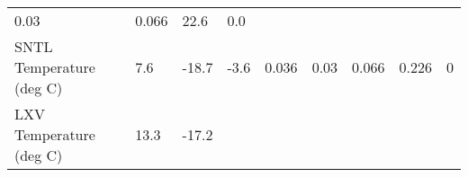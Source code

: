 \documentclass[11pt]{article}
\begin{document}
\begin{longtable}[]{@{}lllllllll@{}}
\begin{minipage}[t]{0.07\columnwidth}
0.03\strut
\end{minipage} & \begin{minipage}[t]{0.06\columnwidth}\raggedright\strut
0.066\strut
\end{minipage} & \begin{minipage}[t]{0.06\columnwidth}\raggedright\strut
22.6\strut
\end{minipage} & \begin{minipage}[t]{0.07\columnwidth}\raggedright\strut
0.0\strut
\end{minipage}\tabularnewline
\begin{minipage}[t]{0.25\columnwidth}\raggedright\strut
SNTL Temperature (deg C)\strut
\end{minipage} & \begin{minipage}[t]{0.06\columnwidth}\raggedright\strut
7.6\strut
\end{minipage} & \begin{minipage}[t]{0.06\columnwidth}\raggedright\strut
-18.7\strut
\end{minipage} & \begin{minipage}[t]{0.08\columnwidth}\raggedright\strut
-3.6\strut
\end{minipage} & \begin{minipage}[t]{0.05\columnwidth}\raggedright\strut
0.036\strut
\end{minipage} & \begin{minipage}[t]{0.07\columnwidth}\raggedright\strut
0.03\strut
\end{minipage} & \begin{minipage}[t]{0.06\columnwidth}\raggedright\strut
0.066\strut
\end{minipage} & \begin{minipage}[t]{0.06\columnwidth}\raggedright\strut
0.226\strut
\end{minipage} & \begin{minipage}[t]{0.07\columnwidth}\raggedright\strut
0\strut
\end{minipage}\tabularnewline
\begin{minipage}[t]{0.25\columnwidth}\raggedright\strut
LXV Temperature (deg C)\strut
\end{minipage} & \begin{minipage}[t]{0.06\columnwidth}\raggedright\strut
13.3\strut
\end{minipage} & \begin{minipage}[t]{0.06\columnwidth}\raggedright\strut
-17.2\strut
\end{minipage} & \begin{minipage}[t]{0.08\columnwidth}\raggedright\strut

\end{minipage}
\end{longtable}
\end{document}

